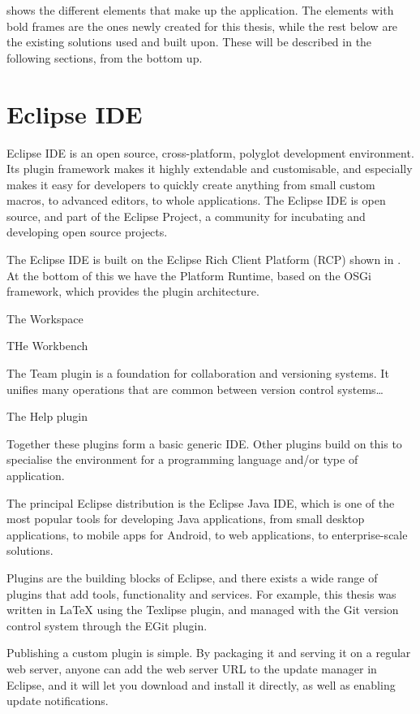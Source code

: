 	 shows the different elements that make up the application.
	The elements with bold frames are the ones newly created for this thesis, while
	the rest below are the existing solutions used and built upon. These will be
	described in the following sections, from the bottom up.

\section{Eclipse IDE}
Eclipse IDE \cite{eclipse} is an open source, cross-platform, polyglot
development environment.
Its plugin framework makes it highly extendable and customisable, and
especially makes it easy for developers to quickly create anything from small
custom macros, to advanced editors, to whole applications. The Eclipse IDE is
open source, and part of the Eclipse Project, a community for incubating and
developing open source projects.


The Eclipse IDE is built on the Eclipse Rich Client Platform (RCP) shown in
. At the bottom of this we have the Platform Runtime, based
on the OSGi framework, which provides the plugin architecture.

The Workspace 

THe Workbench 

The Team plugin is a foundation for collaboration and versioning systems. It
unifies many operations that are common between version control systems\ldots

The Help plugin 

Together these plugins form a basic generic IDE. Other plugins build on this to
specialise the environment for a programming language and/or type of
application.

The principal Eclipse distribution is the Eclipse Java IDE, which is one of the
most popular tools for developing Java applications, from small
desktop applications, to mobile apps for Android, to web applications, to
enterprise-scale solutions. 

Plugins are the building blocks of Eclipse, and there exists a wide range of
plugins that add tools, functionality and services. For example, this thesis
was written in \LaTeX{} using the Texlipse plugin, and managed with the Git
version control system through the EGit plugin. 

Publishing a custom plugin is simple. By packaging it and serving it on a
regular web server, anyone can add the web server URL to the update manager in
Eclipse, and it will let you download and install it directly, as well as
enabling update notifications.

